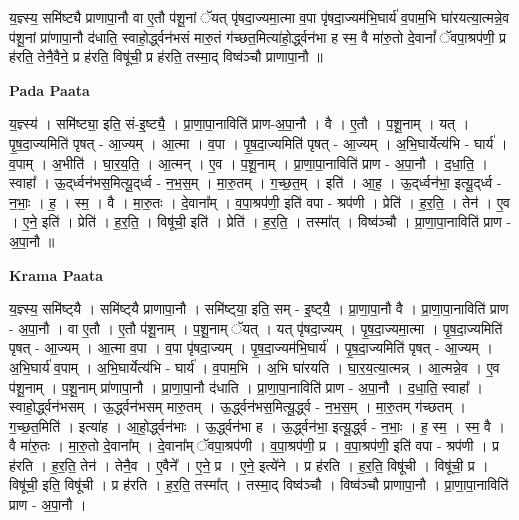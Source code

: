 \documentclass[17pt]{extarticle}
\begin{document}
य॒ज्ञ्स्य॒ समि॑ष्ट्यै प्राणापा॒नौ वा ए॒तौ प॑शू॒नां ॅयत् पृ॑षदा॒ज्यमा॒त्मा व॒पा पृ॑षदा॒ज्यम॑भि॒घार्य॑ व॒पाम॒भि घा॑रयत्या॒त्मन्ने॒व प॑शू॒नां प्रा॑णापा॒नौ द॑धाति॒ स्वाहो॒र्द्ध्वन॑भसं मारु॒तं ग॑च्छत॒मित्या॑हो॒र्द्ध्वन॑भा ह स्म॒ वै मा॑रु॒तो दे॒वानां᳚ ॅवपा॒श्रप॑णी॒ प्र ह॑रति॒ तेनै॒वैने॒ प्र ह॑रति॒ विषू॑ची॒ प्र ह॑रति॒ तस्मा॒द् विष्व॑ञ्चौ प्राणापा॒नौ ॥ \newline

\textbf{Pada Paata} \newline

य॒ज्ञ्स्य॑ । समि॑ष्ट्या॒ इति॒ सं-इ॒ष्ट्यै॒ । प्रा॒णा॒पा॒नाविति॑ प्राण-अ॒पा॒नौ । वै । ए॒तौ । प॒शू॒नाम् । यत् । पृ॒ष॒दा॒ज्यमिति॑ पृषत् - आ॒ज्यम् । आ॒त्मा । व॒पा । पृ॒ष॒दा॒ज्यमिति॑ पृषत् - आ॒ज्यम् । अ॒भि॒घार्येत्य॑भि - घार्य॑ । व॒पाम् । अ॒भीति॑ । घा॒र॒य॒ति॒ । आ॒त्मन् । ए॒व । प॒शू॒नाम् । प्रा॒णा॒पा॒नाविति॑ प्राण - अ॒पा॒नौ । द॒धा॒ति॒ । स्वाहा᳚ । ऊ॒द्‌र्ध्वन॑भस॒मित्यू॒द्‌र्ध्व - न॒भ॒स॒म् । मा॒रु॒तम् । ग॒च्छ॒त॒म् । इति॑ । आ॒ह॒ । ऊ॒द्‌र्ध्वन॑भा॒ इत्यू॒द्‌र्ध्व - न॒भाः॒ । ह॒ । स्म॒ । वै । मा॒रु॒तः । दे॒वाना᳚म् । व॒पा॒श्रप॑णी॒ इति॑ वपा - श्रप॑णी । प्रेति॑ । ह॒र॒ति॒ । तेन॑ । ए॒व । ए॒ने॒ इति॑ । प्रेति॑ । ह॒र॒ति॒ । विषू॑ची॒ इति॑ । प्रेति॑ । ह॒र॒ति॒ । तस्मा᳚त् । विष्व॑ञ्चौ । प्रा॒णा॒पा॒नाविति॑ प्राण - अ॒पा॒नौ ॥  \newline


\textbf{Krama Paata} \newline

य॒ज्ञ्स्य॒ समि॑ष्ट्‍यै । समि॑ष्ट्‍यै प्राणापा॒नौ । समि॑ष्ट्‍या॒ इति॒ सम् - इ॒ष्ट्‍यै॒ । प्रा॒णा॒पा॒नौ वै । प्रा॒णा॒पा॒नाविति॑ प्राण - अ॒पा॒नौ । वा ए॒तौ । ए॒तौ प॑शू॒नाम् । प॒शू॒नाम् ॅयत् । यत् पृ॑षदा॒ज्यम् । पृ॒ष॒दा॒ज्यमा॒त्मा । पृ॒ष॒दा॒ज्यमिति॑ पृषत् - आ॒ज्यम् । आ॒त्मा व॒पा । व॒पा पृ॑षदा॒ज्यम् । पृ॒ष॒दा॒ज्यम॑भि॒घार्य॑ । पृ॒ष॒दा॒ज्यमिति॑ पृषत् - आ॒ज्यम् । अ॒भि॒घार्य॑ व॒पाम् । अ॒भि॒घार्येत्य॑भि - घार्य॑ । व॒पाम॒भि । अ॒भि घा॑रयति । घा॒र॒य॒त्या॒त्मन्न् । आ॒त्मन्ने॒व । ए॒व प॑शू॒नाम् । प॒शू॒नाम् प्रा॑णापा॒नौ । प्रा॒णा॒पा॒नौ द॑धाति । प्रा॒णा॒पा॒नाविति॑ प्राण - अ॒पा॒नौ । द॒धा॒ति॒ स्वाहा᳚ । स्वाहो॒र्द्ध्वन॑भसम् । ऊ॒र्द्ध्वन॑भसम् मारु॒तम् । ऊ॒र्द्ध्वन॑भस॒मित्यू॒र्द्ध्व - न॒भ॒स॒म् । मा॒रु॒तम् ग॑च्छतम् । ग॒च्छ॒त॒मिति॑ । इत्या॑ह । आ॒हो॒र्द्ध्वन॑भाः । ऊ॒र्द्ध्वन॑भा ह । ऊ॒र्द्ध्वन॑भा॒ इत्यू॒र्द्ध्व - न॒भाः॒ । ह॒ स्म॒ । स्म॒ वै । वै मा॑रु॒तः । मा॒रु॒तो दे॒वाना᳚म् । दे॒वाना᳚म् ॅवपा॒श्रप॑णी । व॒पा॒श्रप॑णी॒ प्र । व॒पा॒श्रप॑णी॒ इति॑ वपा - श्रप॑णी । प्र ह॑रति । ह॒र॒ति॒ तेन॑ । तेनै॒व । ए॒वैने᳚ । ए॒ने॒ प्र । ए॒ने॒ इत्ये॑ने । प्र ह॑रति । ह॒र॒ति॒ विषू॑ची । विषू॑ची॒ प्र । विषू॑ची॒ इति॒ विषू॑ची । प्र ह॑रति । ह॒र॒ति॒ तस्मा᳚त् । तस्मा॒द् विष्व॑ञ्चौ । विष्व॑ञ्चौ प्राणापा॒नौ । प्रा॒णा॒पा॒नाविति॑ प्राण - अ॒पा॒नौ । \newline
\end{document}

